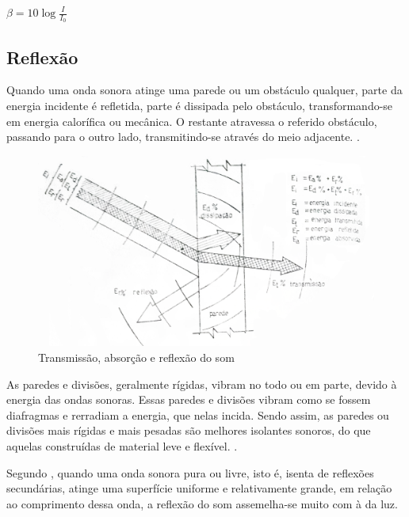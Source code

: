 \begin{center}
\begin{Large}
$ \beta = 10\log{\frac{I}{I_{0}}} $
\end{Large}
\end{center}

\subsection{Reflexão}

Quando uma onda sonora atinge uma parede ou um obstáculo qualquer, parte da energia incidente é refletida, parte é dissipada pelo obstáculo, transformando-se em energia calorífica ou mecânica. O restante atravessa o referido obstáculo, passando para o outro lado, transmitindo-se através do meio adjacente. \cite{silva}.

\begin{figure}[!htb]
\centering
\includegraphics[scale=0.2]{figuras/Reflexao}
\caption{Transmissão, absorção e reflexão do som \cite{silva}}
\label{fig:reflexao}
\end{figure}

As paredes e divisões, geralmente rígidas, vibram no todo ou em parte, devido à energia das ondas sonoras. Essas paredes e divisões vibram como se fossem diafragmas e rerradiam a energia, que nelas incida. Sendo assim, as paredes ou divisões mais rígidas e mais pesadas são melhores isolantes sonoros, do que aquelas construídas de material leve e flexível. \cite[pág.~83]{silva}.

Segundo , quando uma onda sonora pura ou livre, isto é, isenta de reflexões secundárias, atinge uma superfície uniforme e relativamente grande, em relação ao comprimento dessa onda, a reflexão do som assemelha-se muito com à da luz.

